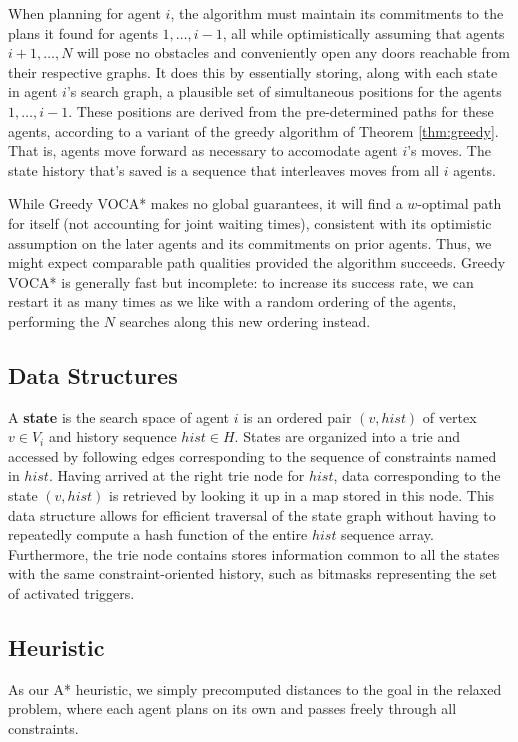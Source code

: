 \documentclass[letterpaper]{article}
\begin{document}
When planning for agent $i$, the algorithm must maintain its commitments to the plans it found for agents $1,\ldots,i-1$, all while optimistically assuming that agents $i+1,\ldots,N$ will pose no obstacles and conveniently open any doors reachable from their respective graphs. It does this by essentially storing, along with each state in agent $i$'s search graph, a plausible set of simultaneous positions for the agents $1,\ldots,i-1$. These positions are derived from the pre-determined paths for these agents,  according to a variant of the greedy algorithm of Theorem \ref{thm:greedy}. That is, agents move forward as necessary to accomodate agent $i$'s moves. The state history that's saved is a sequence that interleaves moves from all $i$ agents.

While Greedy VOCA* makes no global guarantees, it will find a $w$-optimal path for itself (not accounting for joint waiting times), consistent with its optimistic assumption on the later agents and its commitments on prior agents. Thus, we might expect comparable path qualities provided the algorithm succeeds. Greedy VOCA* is generally fast but incomplete: to increase its success rate, we can restart it as many times as we like with a random ordering of the agents, performing the $N$ searches along this new ordering instead.

\subsection{Data Structures}
A \textbf{state} is the search space of agent $i$ is an ordered pair $(v, hist)$ of vertex $v\in V_i$ and history sequence $hist\in H$. States are organized into a trie and accessed by following edges corresponding to the sequence of constraints named in $hist$. Having arrived at the right trie node for $hist$, data corresponding to the state $(v, hist)$ is retrieved by looking it up in a map stored in this node. This data structure allows for efficient traversal of the state graph without having to repeatedly compute a hash function of the entire $hist$ sequence array. Furthermore, the trie node contains stores information common to all the states with the same constraint-oriented history, such as bitmasks representing the set of activated triggers.

\subsection{Heuristic}
As our A* heuristic, we simply precomputed distances to the goal in the relaxed problem, where each agent plans on its own and passes freely through all constraints.
\end{document}
